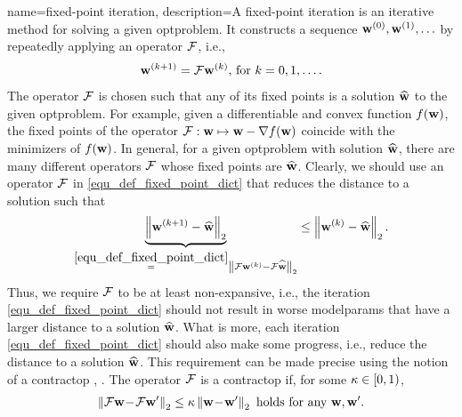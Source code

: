 {name={fixed-point iteration},
	description={A fixed-point iteration is an iterative method for solving 
		a given \gls{optproblem}. It constructs a sequence ${\bf w}^{(0)}, {\bf w}^{(1)},\ldots$ by 
		 repeatedly applying an operator $\mathcal{F}$, i.e., 
		 \begin{equation} 
		 	\label{equ_def_fixed_point_dict} 
		 	{\bf w}^{(k+1)} = \mathcal{F} {\bf w}^{(k)} \mbox{, for } k=0,1,\ldots.
		 \end{equation} 
		 The operator $\mathcal{F}$ is chosen such that any of its fixed points is a solution 
		 $\widehat{{\bf w}}$ to the given \gls{optproblem}. For example, given a \gls{differentiable} and 
		 \gls{convex} \gls{function} $f({\bf w})$, the fixed points of the operator $\mathcal{F}: {\bf w} \mapsto {\bf w} - \nabla f({\bf w})$ 
		 coincide with the minimizers of $f({\bf w})$. In general, for a given \gls{optproblem} with solution $\widehat{{\bf w}}$, 
		 there are many different operators $\mathcal{F}$ whose fixed points are $\widehat{{\bf w}}$. 
		 Clearly, we should use an operator $\mathcal{F}$ in \eqref{equ_def_fixed_point_dict} that reduces the distance to a solution such that
		\begin{equation} 
			\nonumber
			\underbrace{\left\Vert { {\bf w}^{(k+1)} - \widehat{\mathbf{w}}} \right\Vert_{2}}_{\stackrel{\eqref{equ_def_fixed_point_dict}}{=} \left\Vert { \mathcal{F}{\bf w}^{(k)} - \mathcal{F}\widehat{{\bf w}}} \right\Vert_{2}}  \leq 	\left\Vert { {\bf w}^{(k)} - \widehat{{\bf w}}} \right\Vert_{2}. 
		\end{equation}
		Thus, we require $\mathcal{F}$ to be at least non-expansive, i.e., the iteration \eqref{equ_def_fixed_point_dict} 
		should not result in worse \gls{modelparams} that have a larger distance to a solution $\widehat{{\bf w}}$. 
		What is more, each iteration \eqref{equ_def_fixed_point_dict} should also make some progress, i.e., 
		reduce the distance to a solution $\widehat{{\bf w}}$. This requirement can be made precise using 
		the notion of a \gls{contractop} \cite{Bauschke:2017}, \cite{fixedpoinIsta}. 
		The operator $\mathcal{F}$ is a \gls{contractop} if, for some $\kappa \in [0,1)$,
		\begin{equation} 
			\nonumber
			\left\Vert { \mathcal{F}{\bf w}\!-\!\mathcal{F}{\bf w}'} \right\Vert_{2}  \leq  \kappa	\left\Vert {{\bf w}\!-\!{\bf w}'} \right\Vert_{2} \mbox{ holds for any } {\bf w},{\bf w}'.
		\end{equation}
}}
